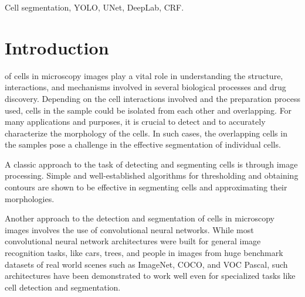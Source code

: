 \documentclass[journal]{IEEEtran}
\begin{document}
\begin{IEEEkeywords}
Cell segmentation, YOLO, UNet, DeepLab, CRF.
\end{IEEEkeywords}






%
\IEEEpeerreviewmaketitle



\section{Introduction}
 of cells in microscopy images play a vital role in understanding the structure, interactions, and mechanisms involved in several 
biological processes and drug discovery. Depending on the cell interactions involved and the preparation process used, cells in the sample could be isolated from each other and overlapping. For many applications and purposes, it is crucial to detect and to accurately characterize the morphology of the cells. In such cases, the overlapping cells in the samples pose a challenge in the effective segmentation of individual cells. 

A classic approach to the task of detecting and segmenting cells is through image processing. Simple and well-established algorithms for thresholding and obtaining contours are shown to be effective in segmenting cells and approximating their morphologies. 

Another approach to the detection and segmentation of cells in microscopy images involves the use of convolutional neural networks. While most convolutional neural network architectures were built for general image recognition tasks, like cars, trees, and people in images from huge benchmark datasets of real world scenes such as ImageNet, COCO, and VOC Pascal, such architectures have been demonstrated to work well even for specialized tasks like cell detection and segmentation. 
\end{document}
